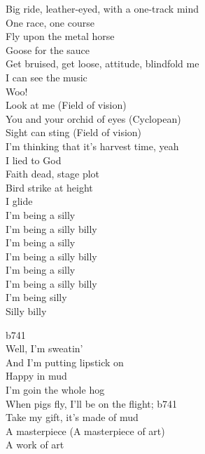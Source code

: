 Big ride, leather-eyed, with a one-track mind \\
One race, one course \\
Fly upon the metal horse \\
Goose for the sauce \\
Get bruised, get loose, attitude, blindfold me \\
I can see the music \\
Woo! \\

Look at me (Field of vision) \\
You and your orchid of eyes (Cyclopean) \\
Sight can sting (Field of vision) \\
I'm thinking that it's harvest time, yeah \\

I lied to God \\
Faith dead, stage plot \\
Bird strike at height \\
I glide \\

I'm being a silly \\
I'm being a silly billy \\
I'm being a silly \\
I'm being a silly billy \\
I'm being a silly \\
I'm being a silly billy \\
I'm being silly \\
Silly billy \\



b741 \\

Well, I'm sweatin' \\
And I'm putting lipstick on \\
Happy in mud \\
I'm goin the whole hog \\

When pigs fly, I'll be on the flight; b741 \\

Take my gift, it's made of mud \\
A masterpiece (A masterpiece of art) \\
A work of art \\

